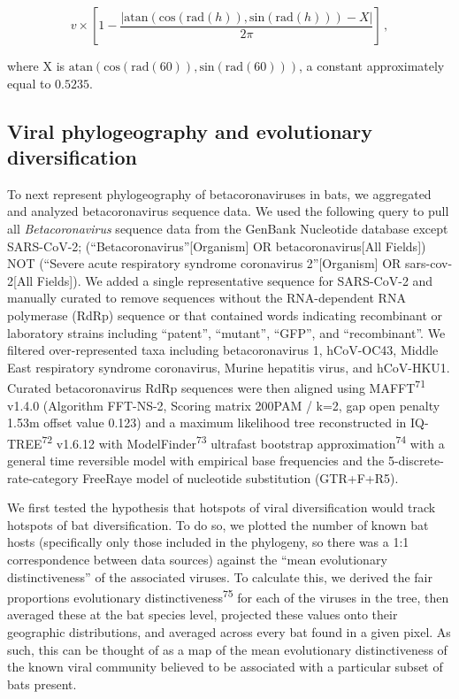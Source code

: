\documentclass[10pt,oneside]{article}
\begin{document}
\[
v\times\left[1-\frac{\left|\text{atan}\left(\text{cos}(\text{rad}(h)), \text{sin}(\text{rad}(h))\right) - X\right|}{2\pi}\right]\,,
\]

where X is
\(\text{atan}\left(\text{cos}(\text{rad}(60)), \text{sin}(\text{rad}(60))\right)\),
a constant approximately equal to \(0.5235\).

\hypertarget{viral-phylogeography-and-evolutionary-diversification}{%
\subsection{Viral phylogeography and evolutionary
diversification}\label{viral-phylogeography-and-evolutionary-diversification}}

To next represent phylogeography of betacoronaviruses in bats, we
aggregated and analyzed betacoronavirus sequence data. We used the
following query to pull all \emph{Betacoronavirus} sequence data from
the GenBank Nucleotide database except SARS-CoV-2;
(``Betacoronavirus''{[}Organism{]} OR betacoronavirus{[}All Fields{]})
NOT (``Severe acute respiratory syndrome coronavirus 2''{[}Organism{]}
OR sars-cov-2{[}All Fields{]}). We added a single representative
sequence for SARS-CoV-2 and manually curated to remove sequences without
the RNA-dependent RNA polymerase (RdRp) sequence or that contained words
indicating recombinant or laboratory strains including ``patent'',
``mutant'', ``GFP'', and ``recombinant''. We filtered over-represented
taxa including betacoronavirus 1, hCoV-OC43, Middle East respiratory
syndrome coronavirus, Murine hepatitis virus, and hCoV-HKU1. Curated
betacoronavirus RdRp sequences were then aligned using
MAFFT\textsuperscript{71} v1.4.0 (Algorithm FFT-NS-2, Scoring matrix
200PAM / k=2, gap open penalty 1.53m offset value 0.123) and a maximum
likelihood tree reconstructed in IQ-TREE\textsuperscript{72} v1.6.12
with ModelFinder\textsuperscript{73} ultrafast bootstrap
approximation\textsuperscript{74} with a general time reversible model
with empirical base frequencies and the 5-discrete-rate-category
FreeRaye model of nucleotide substitution (GTR+F+R5).

We first tested the hypothesis that hotspots of viral diversification
would track hotspots of bat diversification. To do so, we plotted the
number of known bat hosts (specifically only those included in the
phylogeny, so there was a 1:1 correspondence between data sources)
against the ``mean evolutionary distinctiveness'' of the associated
viruses. To calculate this, we derived the fair proportions evolutionary
distinctiveness\textsuperscript{75} for each of the viruses in the tree,
then averaged these at the bat species level, projected these values
onto their geographic distributions, and averaged across every bat found
in a given pixel. As such, this can be thought of as a map of the mean
evolutionary distinctiveness of the known viral community believed to be
associated with a particular subset of bats present.
\end{document}
